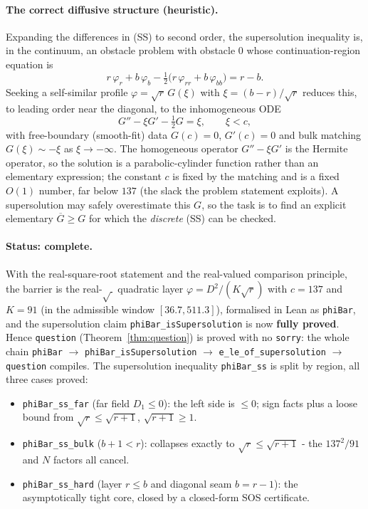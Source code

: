 \documentclass{article}
\begin{document}
\paragraph{The correct diffusive structure (heuristic).}
Expanding the differences in (SS) to second order, the supersolution inequality is,
in the continuum, an obstacle problem with obstacle $0$ whose continuation-region
equation is
\[
  r\,\varphi_r+b\,\varphi_b-\tfrac12\big(r\,\varphi_{rr}+b\,\varphi_{bb}\big)=r-b .
\]
Seeking a self-similar profile $\varphi=\sqrt r\,G(\xi)$ with $\xi=(b-r)/\sqrt r$
reduces this, to leading order near the diagonal, to the inhomogeneous ODE
\[
  G''-\xi G'-\tfrac12 G=\xi,\qquad \xi<c,
\]
with free-boundary (smooth-fit) data $G(c)=0$, $G'(c)=0$ and bulk matching
$G(\xi)\sim -\xi$ as $\xi\to-\infty$. The homogeneous operator $G''-\xi G'$ is the
Hermite operator, so the solution is a parabolic-cylinder function rather than an
elementary expression; the constant $c$ is fixed by the matching and is a fixed
$O(1)$ number, far below $137$ (the slack the problem statement exploits). A
supersolution may safely overestimate this $G$, so the task is to find an explicit
elementary $\overline G\ge G$ for which the \emph{discrete} (SS) can be checked.

\paragraph{Status: complete.}
With the real-square-root statement and the real-valued comparison principle, the
barrier is the real-$\sqrt{\,}$ quadratic layer $\varphi=D^2/(K\sqrt r)$ with $c=137$
and $K=91$ (in the admissible window $[36.7,511.3]$), formalised in Lean as
\texttt{phiBar}, and the supersolution claim \texttt{phiBar\_isSupersolution} is now
\textbf{fully proved}. Hence \texttt{question} (Theorem~\ref{thm:question}) is proved
with no \texttt{sorry}: the whole chain \texttt{phiBar} $\to$
\texttt{phiBar\_isSupersolution} $\to$ \texttt{e\_le\_of\_supersolution} $\to$
\texttt{question} compiles. The supersolution inequality \texttt{phiBar\_ss} is split
by region, all three cases proved:
\begin{itemize}
  \item \texttt{phiBar\_ss\_far} (far field $D_1\le0$): the left side is $\le0$;
  sign facts plus a loose bound from $\sqrt r\le\sqrt{r+1}$, $\sqrt{r+1}\ge1$.
  \item \texttt{phiBar\_ss\_bulk} ($b+1<r$): collapses exactly to
  $\sqrt r\le\sqrt{r+1}$ - the $137^2/91$ and $N$ factors all cancel.
  \item \texttt{phiBar\_ss\_hard} (layer $r\le b$ and diagonal seam $b=r-1$): the
  asymptotically tight core, closed by a closed-form SOS certificate.
\end{itemize}
\end{document}
